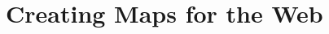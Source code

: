 \documentclass[11pt, oneside]{report}
\begin{document}




\chapter{Creating Maps for the Web}
\label{chapter:state:of:the:art:map:generalization}
\end{document}
